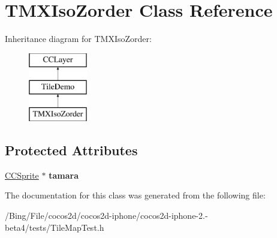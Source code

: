 \hypertarget{interface_t_m_x_iso_zorder}{\section{T\-M\-X\-Iso\-Zorder Class Reference}
\label{interface_t_m_x_iso_zorder}
}
Inheritance diagram for T\-M\-X\-Iso\-Zorder\-:\begin{figure}[H]
\begin{center}
\leavevmode
\includegraphics[height=3.000000cm]{interface_t_m_x_iso_zorder}
\end{center}
\end{figure}
\subsection*{Protected Attributes}
\begin{DoxyCompactItemize}
\item 
\hypertarget{interface_t_m_x_iso_zorder_a81e9070d1ff14c8fce3801fe3f400329}{\hyperlink{class_c_c_sprite}{C\-C\-Sprite} $\ast$ {\bfseries tamara}}\label{interface_t_m_x_iso_zorder_a81e9070d1ff14c8fce3801fe3f400329}

\end{DoxyCompactItemize}


The documentation for this class was generated from the following file\-:\begin{DoxyCompactItemize}
\item 
/\-Bing/\-File/cocos2d/cocos2d-\/iphone/cocos2d-\/iphone-\/2.-\/beta4/tests/Tile\-Map\-Test.\-h\end{DoxyCompactItemize}
